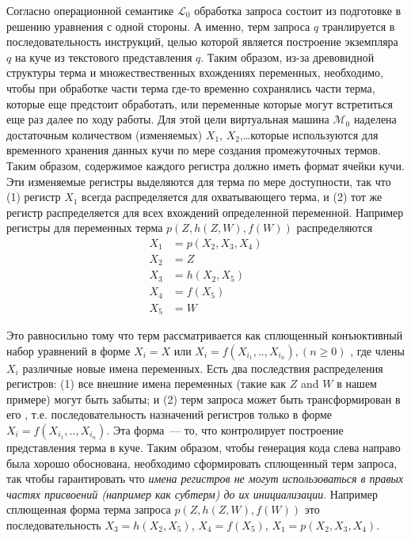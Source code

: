 
Согласно операционной семантике $\mathcal L_0$ обработка запроса состоит из
подготовке в решению уравнения с одной стороны. А именно, терм запроса $q$
транлируется в последовательность инструкций, целью которой является построение
экземпляра $q$ на куче из текстового представления $q$. Таким образом, из-за
древовидной структуры терма и множествественных вхождениях переменных,
необходимо, чтобы при обработке части терма где-то временно сохранялись части
терма, которые еще предстоит обработать, или переменные которые могут
встретиться еще раз далее по ходу работы. Для этой цели виртуальная машина
$\mathcal M_0$ наделена достаточным количеством (изменяемых)
 $X_1$, $X_2$,\ldots которые используются
для временного хранения данных кучи по мере создания промежуточных термов. Таким
образом, содержимое каждого регистра должно иметь формат ячейки кучи. Эти
изменяемые регистры выделяются для терма по мере доступности, так что (1)
регистр $X_1$ всегда распределяется для охватывающего терма, и (2) тот же
регистр распределяется для всех вхождений определенной переменной.
Например регистры для переменных терма $p(Z,h(Z,W),f(W))$ распределяются
\begin{equation*}
\begin{split}
X_1 &= p(X_2,X_3,X_4)\\
X_2 &= Z\\
X_3 &= h(X_2,X_5)\\
X_4 &= f(X_5)\\
X_5 &= W
\end{split}
\end{equation*}

Это равносильно тому что терм рассматривается как сплющенный конъюктивный набор
уравнений в форме $X_i=X$ или $X_i=f(X_{i_1},..,X_{i_n}), (n \geqslant 0)$ ,
где члены $X_i$ различные новые имена переменных. Есть два последствия
распределения регистров: (1) все внешние имена переменных (такие как $Z$ and $W$
в нашем примере) могут быть забыты; и (2) терм запроса может быть
трансформирован в его ,
т.е. последовательность назначений регистров только в форме 
$X_i=f(X_{i_1},..,X_{i_n})$. Эта форма\ --- то, что контролирует построение
представления терма в куче. Таким образом, чтобы генерация кода слева направо
была хорошо обоснована, необходимо сформировать сплющенный терм запроса, так
чтобы гарантировать что \emph{имена регистров не могут использоваться в правых
частях присвоений (например как субтерм) до их инициализации}. Например сплющенная форма терма запроса
$p(Z,h(Z,W),f(W))$ это последовательность
$X_3=h(X_2,X_5)$, $X_4=f(X_5)$, $X_1=p(X_2,X_3,X_4)$.

